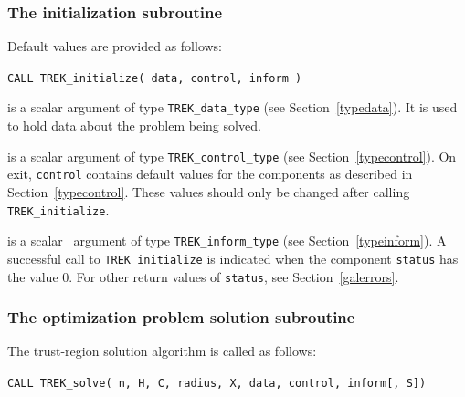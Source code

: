 \documentclass{galahad}
\newcommand{\packagename}{TREK}
\begin{document}

\subsubsection{The initialization subroutine}\label{subinit}
 Default values are provided as follows:

\vspace*{2mm}
\hskip0.5in
{\tt CALL \packagename\_initialize( data, control, inform )}

\begin{description}

 is a scalar \intentinout argument of type
{\tt \packagename\_data\_type}
(see Section~\ref{typedata}). It is used to hold data about the problem being
solved.

 is a scalar \intentout argument of type
{\tt \packagename\_control\_type}
(see Section~\ref{typecontrol}).
On exit, {\tt control} contains default values for the components as
described in Section~\ref{typecontrol}.
These values should only be changed after calling
{\tt \packagename\_initialize}.

 is a scalar \intentout\ argument of type
{\tt \packagename\_inform\_type}
(see Section~\ref{typeinform}). A successful call to
{\tt \packagename\_initialize}
is indicated when the  component {\tt status} has the value 0.
For other return values of {\tt status}, see Section~\ref{galerrors}.

\end{description}


\subsubsection{The optimization problem solution subroutine}
The trust-region solution algorithm is called as follows:

\vspace*{2mm}
\hskip0.5in
{\tt CALL \packagename\_solve( n, H, C, radius, X, data, control, inform[, S])}
\end{document}
